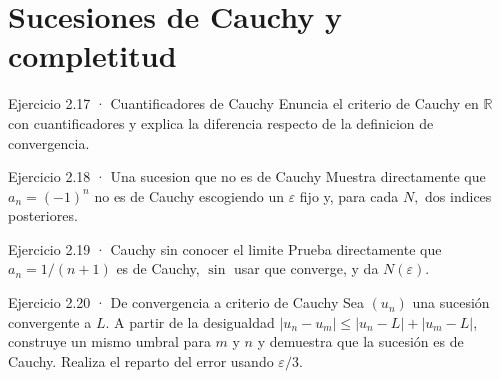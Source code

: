 \documentclass[10pt,a4paper,oneside,openany]{book}
\begin{document}
\section{Sucesiones de Cauchy y completitud}
\begin{PSevenExerciseFixed}{Ejercicio 2.17 · Cuantificadores de Cauchy}
Enuncia el criterio de Cauchy en \(\mathbb{R}\) con cuantificadores y explica la diferencia respecto de la definicion de convergencia.
\end{PSevenExerciseFixed}
\begin{PSevenExerciseFixed}{Ejercicio 2.18 · Una sucesion que no es de Cauchy}
Muestra directamente que \(a_n=(-1)^n\) no es de Cauchy escogiendo un \(\varepsilon \) fijo y, para cada \(N,\) dos indices posteriores.
\end{PSevenExerciseFixed}
\begin{PSevenExerciseFixed}{Ejercicio 2.19 · Cauchy sin conocer el limite}
Prueba directamente que \(a_n=1/(n+1)\) es de Cauchy, \(\sin\) usar que converge, y da \(N(\varepsilon )\).
\end{PSevenExerciseFixed}
\begin{PSevenExerciseFixed}{Ejercicio 2.20 · De convergencia a criterio de Cauchy}
Sea \((u_n)\) una sucesión convergente a \(L\). A partir de la desigualdad \(|u_n-u_m|\le |u_n-L|+|u_m-L|\), construye un mismo umbral para \(m\) y \(n\) y demuestra que la sucesión es de Cauchy. Realiza el reparto del error usando \(\varepsilon/3\).
\end{PSevenExerciseFixed}
\end{document}
